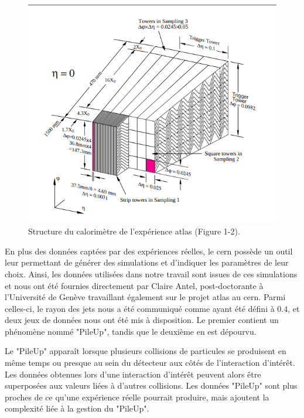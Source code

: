 \begin{figure}[hbt!]
    \centering
    \includegraphics[scale=0.4]{Figures/dataset/structure_of_the_calorimeter.png}
    \caption{Structure du calorimètre de l'expérience \acrshort{atlas} \cite{noauthor_atlas_1996} (Figure 1-2).}
    \label{fig:calorimeter_structure}
\end{figure}

\break

En plus des données captées par des expériences réelles, le \acrshort{cern} possède un outil leur permettant de générer des simulations et d'indiquer les paramètres de leur choix. Ainsi, les données utilisées dans notre travail sont issues de ces simulations et nous ont été fournies directement par Claire Antel, post-doctorante à l'Université de Genève travaillant également sur le projet \acrshort{atlas} au \acrshort{cern}. Parmi celles-ci, le rayon des jets nous a été communiqué comme ayant été défini à $0.4$, et deux jeux de données nous ont été mis à disposition. Le premier contient un phénomène nommé "PileUp", tandis que le deuxième en est dépourvu.

Le "PileUp" apparaît lorsque plusieurs collisions de particules se produisent en même temps ou presque au sein du détecteur aux côtés de l'interaction d'intérêt. Les données obtenues lors d'une interaction d'intérêt peuvent alors être superposées aux valeurs liées à d'autres collisions. Les données "PileUp" sont plus proches de ce qu'une expérience réelle pourrait produire, mais ajoutent la complexité liée à la gestion du "PileUp".

